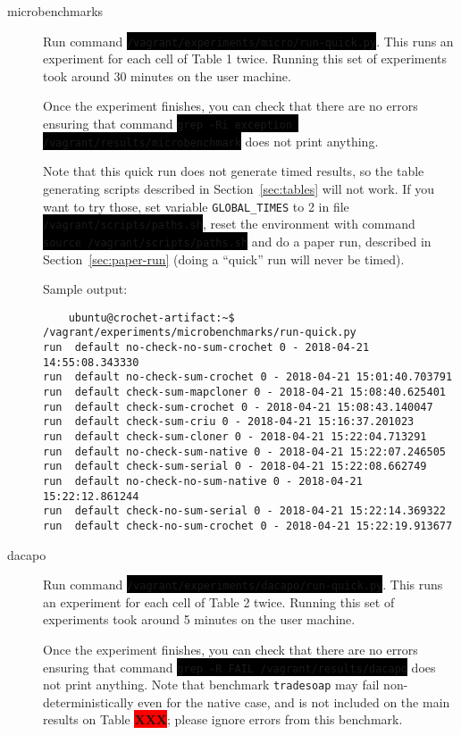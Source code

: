 \documentclass[12pt]{article}
\newcommand{\command}[1]{\colorbox{black}{\texttt{\color{white}#1}}}
\newcommand{\XXX}{\colorbox{red}{\bf\color{white}XXX}}
\begin{document}
\begin{description}

    \item[microbenchmarks] Run command
        \command{/vagrant/experiments/micro/run-quick.py}.  This runs an
        experiment for each cell of Table 1 twice.  Running this set of
        experiments took around 30 minutes on the user machine.

        Once the experiment finishes, you can check that there are no errors
        ensuring that command \command{grep -Ri exception /vagrant/results/microbenchmark}
        does not print anything.

        Note that this quick run does not generate timed results, so the
        table generating scripts described in Section~\ref{sec:tables} will not
        work.  If you want to try those, set variable \texttt{GLOBAL\_TIMES} to
        2 in file \command{/vagrant/scripts/paths.sh}, reset the environment with
        command \command{source /vagrant/scripts/paths.sh} and do a paper run,
        described in Section~\ref{sec:paper-run} (doing a ``quick'' run will never be timed).

Sample output:
\begin{verbatim}
	ubuntu@crochet-artifact:~$ /vagrant/experiments/microbenchmarks/run-quick.py 
run  default no-check-no-sum-crochet 0 - 2018-04-21 14:55:08.343330
run  default no-check-sum-crochet 0 - 2018-04-21 15:01:40.703791
run  default check-sum-mapcloner 0 - 2018-04-21 15:08:40.625401
run  default check-sum-crochet 0 - 2018-04-21 15:08:43.140047
run  default check-sum-criu 0 - 2018-04-21 15:16:37.201023
run  default check-sum-cloner 0 - 2018-04-21 15:22:04.713291
run  default no-check-sum-native 0 - 2018-04-21 15:22:07.246505
run  default check-sum-serial 0 - 2018-04-21 15:22:08.662749
run  default no-check-no-sum-native 0 - 2018-04-21 15:22:12.861244
run  default check-no-sum-serial 0 - 2018-04-21 15:22:14.369322
run  default check-no-sum-crochet 0 - 2018-04-21 15:22:19.913677
\end{verbatim}
    \item[dacapo] Run command \command{/vagrant/experiments/dacapo/run-quick.py}.
        This runs an experiment for each cell of Table 2 twice.  Running this
        set of experiments took around 5 minutes on the user machine.

        Once the experiment finishes, you can check that there are no errors
        ensuring that command \command{grep -R FAIL /vagrant/results/dacapo} does not
        print anything.  Note that benchmark \texttt{tradesoap} may fail
        non-deterministically even for the native case, and is not included on
        the main results on Table \XXX; please ignore errors from this benchmark.


\end{description}
\end{document}
